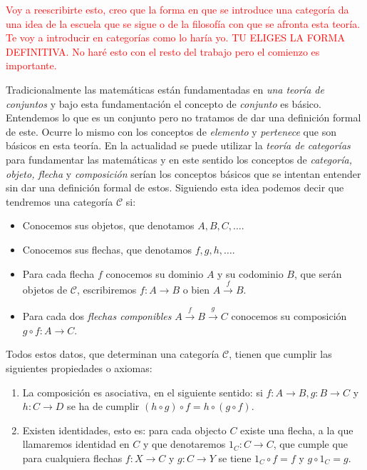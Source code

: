 \textcolor{red}{Voy a reescribirte esto, creo que la forma en que se introduce una categoría da una idea de la escuela que se sigue o de la filosofía con que se afronta esta teoría. Te voy a introducir en categorías como lo haría yo. TU ELIGES LA FORMA DEFINITIVA. No haré esto con el resto del trabajo pero el comienzo es importante.}

Tradicionalmente las matemáticas están fundamentadas en  \emph{una teoría de conjuntos} y bajo esta fundamentación el concepto de \emph{conjunto} es básico. Entendemos lo que es un conjunto pero no tratamos de dar una definición formal de este. Ocurre lo mismo con los conceptos de \emph{elemento} y \emph{pertenece} que son básicos en esta teoría.  En la actualidad se puede utilizar la \emph{teoría de categorías} para fundamentar las matemáticas y en este sentido los conceptos de \emph{categoría, objeto, flecha} y \emph{composición} serían los conceptos básicos que se intentan entender sin dar una definición formal de estos. Siguiendo esta idea podemos decir que tendremos una categoría $\mathcal{C}$ si:
\begin{itemize}
	\item Conocemos sus objetos, que denotamos $A,B,C,\ldots.$
	\item Conocemos sus flechas, que denotamos $f,g,h,\ldots.$
	\item Para cada flecha $f$ conocemos su dominio $A$ y su codominio $B$, que serán objetos de $\mathcal{C}$, escribiremos $f:A\rightarrow B$ o bien $A\xrightarrow{f} B$.
	\item Para cada dos \emph{flechas componibles} $A\xrightarrow{f} B\xrightarrow{g} C$ conocemos su composición $g\circ f :A\rightarrow C$.
\end{itemize}
Todos estos datos, que determinan una categoría $\mathcal{C}$, tienen que cumplir las siguientes propiedades o axiomas:
\begin{enumerate}
	\item La composición es asociativa, en el siguiente sentido: si $f : A \longrightarrow B, g: B \longrightarrow C$ y $h : C \longrightarrow D$ se ha de cumplir
	$(h \circ g) \circ f = h \circ (g \circ f)$.
	\item Existen identidades, esto es: para cada objecto $C$ existe una
	flecha, a la que llamaremos identidad en $C$ y que denotaremos $1_C : C \longrightarrow C$, que cumple que
	para cualquiera flechas $f: X \longrightarrow C$ y  $g : C \longrightarrow Y$ se tiene
	$1_C \circ f = f$  y  $g \circ 1_C = g$.
\end{enumerate}

